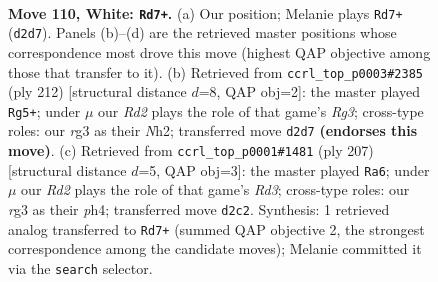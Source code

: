\documentclass[11pt]{article}
\begin{document}
\clearpage

\begin{figure}[p]\centering
\begin{subfigure}{0.46\textwidth}\centering
\resizebox{\linewidth}{!}{%
\newchessgame
\chessboard[
  setfen={8/5k2/8/8/8/6r1/3RK3/7r w - - 30 110},
  showmover=false,
  pgfstyle=straightmove, color=movearrow, markmove={d2-d7}
]}
\caption{}
\end{subfigure}\hfill
\begin{subfigure}{0.46\textwidth}\centering
\resizebox{\linewidth}{!}{%
\newchessgame
\chessboard[
  setfen={8/5r2/8/4k3/8/6RK/r6N/8 w - - 84 107},
  showmover=false,
  pgfstyle=straightmove, color=movearrow, markmove={g3-g5}
]}
\caption{}
\end{subfigure}
\\[4pt]
\begin{subfigure}{0.46\textwidth}\centering
\resizebox{\linewidth}{!}{%
\newchessgame
\chessboard[
  setfen={5K2/3k4/3r4/8/7P/6p1/8/4R3 b - - 15 104},
  showmover=false,
  pgfstyle=straightmove, color=movearrow, markmove={d6-a6}
]}
\caption{}
\end{subfigure}\hfill

\caption{\textbf{Move 110, White: \texttt{Rd7+}.} (a) Our position; Melanie plays \texttt{Rd7+} (\texttt{d2d7}). Panels (b)--(d) are the retrieved master positions whose correspondence most drove this move (highest QAP objective among those that transfer to it). (b) Retrieved from \texttt{ccrl\_top\_p0003\#2385} (ply 212) [structural distance $d$=8, QAP obj=2]: the master played \texttt{Rg5+}; under $\mu$ our \emph{Rd2} plays the role of that game's \emph{Rg3}; cross-type roles: our \emph{r}g3 as their \emph{N}h2; transferred move \texttt{d2d7} \textbf{(endorses this move)}. (c) Retrieved from \texttt{ccrl\_top\_p0001\#1481} (ply 207) [structural distance $d$=5, QAP obj=3]: the master played \texttt{Ra6}; under $\mu$ our \emph{Rd2} plays the role of that game's \emph{Rd3}; cross-type roles: our \emph{r}g3 as their \emph{p}h4; transferred move \texttt{d2c2}. Synthesis: 1 retrieved analog transferred to \texttt{Rd7+} (summed QAP objective 2, the strongest correspondence among the candidate moves); Melanie committed it via the \texttt{search} selector.}
\label{fig:thought-m218}
\end{figure}
\end{document}
